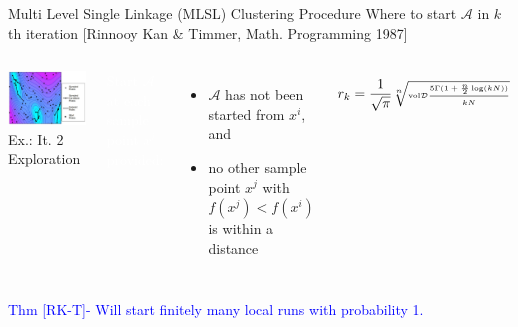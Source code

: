 \documentclass[handout,aspectratio=54]{beamer}
\numberwithin{theorem}{section}
\begin{document}
\begin{frame}{Multi Level Single Linkage (MLSL) Clustering Procedure}
\small
Where to start $\mathcal{A}$ in $k$th iteration \scriptsize\textcolor[RGB]{128,0,128}{ [Rinnooy Kan \& Timmer, Math. Programming 1987]}
\normalsize

\begin{columns}
\includegraphics[width=\textwidth]{fig/39-5.jpg}
Ex.: It. 2 Exploration

\colorbox[rgb]{0.5,0.6,0.7}{\textcolor{white}{Start $\mathcal{A}$ at each sample point}}
\colorbox[rgb]{0.5,0.6,0.7}{\textcolor{white}{$x^i$ provided:}}

\begin{itemize}
\item $\mathcal{A}$ has not been started from $x^i$, and
\item no other sample point $x^j$ with $f(x^j)<f(x^i)$ is within a distance
\end{itemize}
\begin{equation*}\tiny
r_k=\frac{1}{\sqrt{\pi}}\sqrt[n]{\textup{vol}\mathcal{D}\frac{5\Gamma(1+\frac{n}{2}\log(kN))}{kN}}
\end{equation*}
\end{columns}

\textcolor{blue}{Thm [RK-T]- Will start finitely many local runs with probability 1.}
\end{frame}
\end{document}
